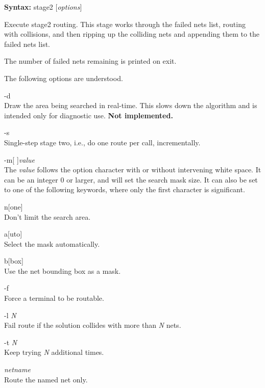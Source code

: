 {\bf Syntax:} {\vt stage2} [{\it options\/}]

Execute stage2 routing.  This stage works through the failed nets
list, routing with collisions, and then ripping up the colliding nets
and appending them to the failed nets list.

The number of failed nets remaining is printed on exit.

The following options are understood.
\begin{description}
\item{\vt -d}\\
Draw the area being searched in real-time.  This slows down the
algorithm and is intended only for diagnostic use.  {\bf Not
implemented.}

\item{\vt -s}\\
Single-step stage two, i.e., do one route per call, incrementally.

\item{\vt -m}[ ]{\it value}\\
The {\it value} follows the option character with or without
intervening white space.  It can be an integer 0 or larger, and will
set the search mask size.  It can also be set to one of the following
keywords, where only the first character is significant.
\begin{description}
\item{\vt n}[{\vt one}]\\
Don't limit the search area.
\item{\vt a}[{\vt uto}]\\
Select the mask automatically.
\item{\vt b}[{\vt box}]\\
Use the net bounding box as a mask.
\end{description}

\item{\vt -f}\\
Force a terminal to be routable.

\item{\vt -l} {\it N}\\
Fail route if the solution collides with more than {\it N} nets.

\item{\vt -t} {\it N}\\
Keep trying {\it N} additional times.

\item{\it netname}\\
Route the named net only.
\end{description}

